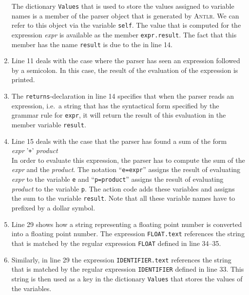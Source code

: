 \begin{enumerate}
      The dictionary \texttt{Values} that is used to store the values assigned to variable names 
      is a member of the parser object that is generated
      by \textsc{Antlr}.  We can refer to this object via the variable \texttt{self}.
      The value that is computed for the expression \textsl{expr} is available as
      the member \texttt{expr.result}.  
      The fact that this member has the name \texttt{result} is due to the 
      in line 14.
\item Line 11 deals with the case where the parser has seen an expression followed by a semicolon.
      In this case, the result of the evaluation of the expression is printed.
\item The \texttt{returns}-declaration in line 14 specifies that when the parser reads an expression,
      i.e.~a string that has the syntactical form specified by the grammar rule for \texttt{expr},
      it will return the result of this evaluation in the member variable \texttt{result}.
\item Line 15 deals with the case that the parser has found a sum of the form
      \\[0.2cm]
      \hspace*{1.3cm}
      \textsl{expr} '\texttt{+}' \textsl{product}
      \\[0.2cm]
      In order to evaluate this expression, the parser has to compute the sum of the \textsl{expr} and the
      \textsl{product}.  The notation ``\texttt{e=expr}'' assigns the result of evaluating \textsl{expr} to the
      variable \texttt{e} and 
      ``\texttt{p=product}'' assigns the result of evaluating \textsl{product} to the variable \texttt{p}.
      The action code adds these variables and assigns the sum to the variable \texttt{result}. 
      Note that all these variable names have to prefixed by a dollar symbol.
\item Line 29 shows how a string representing a floating point number is converted into a floating point
      number.  The expression \texttt{FLOAT.text} references the string that is matched
      by the regular expression \texttt{FLOAT} defined in line 34--35.
\item Similarly, in line 29 the expression \texttt{IDENTIFIER.text} references the string that is matched
      by the regular expression \texttt{IDENTIFIER} defined in line 33.  This string is then used as a key
      in the dictionary \texttt{Values} that stores the values of the variables.
\end{enumerate}

